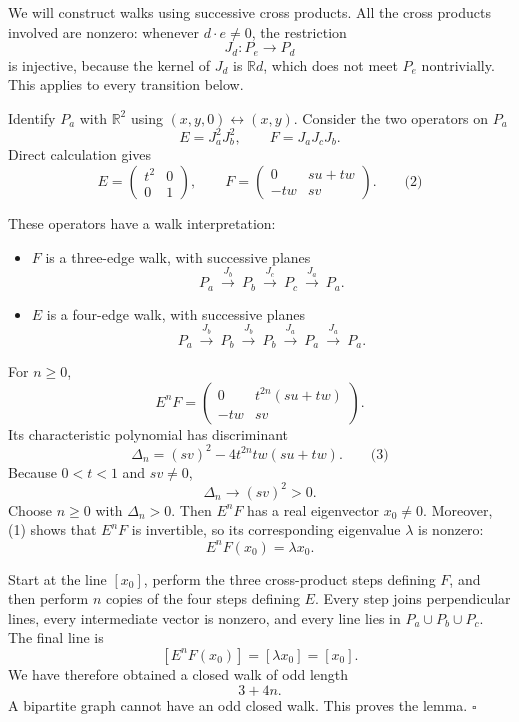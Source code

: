 \documentclass[
  11pt,
  a4paper,
]{article}
\providecommand{\tightlist}{%
  \setlength{\itemsep}{0pt}\setlength{\parskip}{0pt}}
\begin{document}
We will construct walks using successive cross products. All the cross
products involved are nonzero: whenever \(d\cdot e\ne0\), the
restriction \[
J_d:P_e\longrightarrow P_d
\] is injective, because the kernel of \(J_d\) is \(\mathbb R d\), which
does not meet \(P_e\) nontrivially. This applies to every transition
below.

Identify \(P_a\) with \(\mathbb R^2\) using
\((x,y,0)\leftrightarrow(x,y)\). Consider the two operators on \(P_a\)
\[
E=J_a^2J_b^2,\qquad F=J_aJ_cJ_b.
\] Direct calculation gives \[
E=
\begin{pmatrix}
t^2&0\\
0&1
\end{pmatrix},
\qquad
F=
\begin{pmatrix}
0&su+tw\\
-tw&sv
\end{pmatrix}. \qquad\text{(2)}
\]

These operators have a walk interpretation:

\begin{itemize}
\tightlist
\item
  \(F\) is a three-edge walk, with successive planes \[
  P_a\ \xrightarrow{J_b}\ P_b\
  \xrightarrow{J_c}\ P_c\
  \xrightarrow{J_a}\ P_a.
  \]
\item
  \(E\) is a four-edge walk, with successive planes \[
  P_a\ \xrightarrow{J_b}\ P_b\
  \xrightarrow{J_b}\ P_b\
  \xrightarrow{J_a}\ P_a\
  \xrightarrow{J_a}\ P_a.
  \]
\end{itemize}

For \(n\ge0\), \[
E^nF=
\begin{pmatrix}
0&t^{2n}(su+tw)\\
-tw&sv
\end{pmatrix}.
\] Its characteristic polynomial has discriminant \[
\Delta_n
=(sv)^2-4t^{2n}tw(su+tw). \qquad\text{(3)}
\] Because \(0<t<1\) and \(sv\ne0\), \[
\Delta_n\longrightarrow (sv)^2>0.
\] Choose \(n\ge0\) with \(\Delta_n>0\). Then \(E^nF\) has a real
eigenvector \(x_0\ne0\). Moreover, (1) shows that \(E^nF\) is
invertible, so its corresponding eigenvalue \(\lambda\) is nonzero: \[
E^nF(x_0)=\lambda x_0.
\]

Start at the line \([x_0]\), perform the three cross-product steps
defining \(F\), and then perform \(n\) copies of the four steps defining
\(E\). Every step joins perpendicular lines, every intermediate vector
is nonzero, and every line lies in \(P_a\cup P_b\cup P_c\). The final
line is \[
[E^nF(x_0)]=[\lambda x_0]=[x_0].
\] We have therefore obtained a closed walk of odd length \[
3+4n.
\] A bipartite graph cannot have an odd closed walk. This proves the
lemma. \(\square\)
\end{document}
